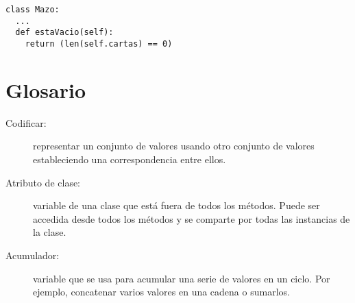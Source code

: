 \beforeverb
\begin{verbatim}
class Mazo:
  ...
  def estaVacio(self):
    return (len(self.cartas) == 0)
\end{verbatim}
\afterverb


\section{Glosario}

\begin{description}

\item[Codificar:]  representar un conjunto de valores usando
otro conjunto de valores estableciendo una correspondencia 
entre ellos.

\item[Atributo de clase:] variable de una clase que está
fuera de todos los métodos. Puede ser accedida desde todos los
métodos y se comparte por todas las instancias de la clase.

\item[Acumulador:] variable que se usa para acumular una
serie de valores en un ciclo. Por ejemplo, concatenar varios
valores en una cadena o sumarlos.


\end{description}
